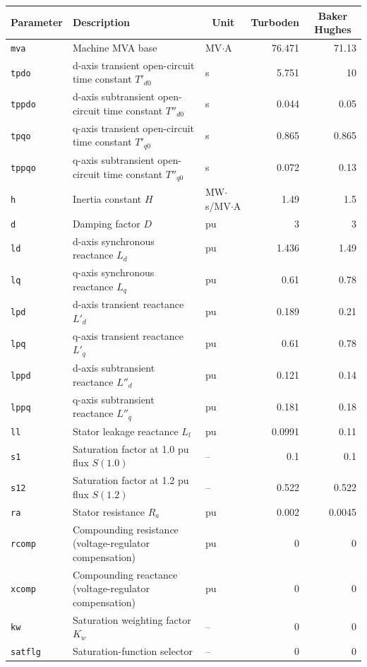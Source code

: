 \begin{tabularx}{\linewidth}{@{}l X l r r@{}}
\toprule
\textbf{Parameter} & \textbf{Description} & \multicolumn{1}{c}{\textbf{Unit}} & \multicolumn{1}{c}{\textbf{Turboden}} & \multicolumn{1}{c}{\textbf{Baker Hughes}} \\
\midrule
\texttt{mva} & Machine MVA base & MV$\cdot$A & 76.471 & 71.13 \\
\texttt{tpdo} & d-axis transient open-circuit time constant $T'_{d0}$ & s & 5.751 & 10 \\
\texttt{tppdo} & d-axis subtransient open-circuit time constant $T''_{d0}$ & s & 0.044 & 0.05 \\
\texttt{tpqo} & q-axis transient open-circuit time constant $T'_{q0}$ & s & 0.865 & 0.865 \\
\texttt{tppqo} & q-axis subtransient open-circuit time constant $T''_{q0}$ & s & 0.072 & 0.13 \\
\texttt{h} & Inertia constant $H$ & MW$\cdot$s/MV$\cdot$A & 1.49 & 1.5 \\
\texttt{d} & Damping factor $D$ & pu & 3 & 3 \\
\texttt{ld} & d-axis synchronous reactance $L_d$ & pu & 1.436 & 1.49 \\
\texttt{lq} & q-axis synchronous reactance $L_q$ & pu & 0.61 & 0.78 \\
\texttt{lpd} & d-axis transient reactance $L'_d$ & pu & 0.189 & 0.21 \\
\texttt{lpq} & q-axis transient reactance $L'_q$ & pu & 0.61 & 0.78 \\
\texttt{lppd} & d-axis subtransient reactance $L''_d$ & pu & 0.121 & 0.14 \\
\texttt{lppq} & q-axis subtransient reactance $L''_q$ & pu & 0.181 & 0.18 \\
\texttt{ll} & Stator leakage reactance $L_l$ & pu & 0.0991 & 0.11 \\
\texttt{s1} & Saturation factor at 1.0 pu flux $S(1.0)$ & -- & 0.1 & 0.1 \\
\texttt{s12} & Saturation factor at 1.2 pu flux $S(1.2)$ & -- & 0.522 & 0.522 \\
\texttt{ra} & Stator resistance $R_a$ & pu & 0.002 & 0.0045 \\
\texttt{rcomp} & Compounding resistance (voltage-regulator compensation) & pu & 0 & 0 \\
\texttt{xcomp} & Compounding reactance (voltage-regulator compensation) & pu & 0 & 0 \\
\texttt{kw} & Saturation weighting factor $K_w$ & -- & 0 & 0 \\
\texttt{satflg} & Saturation-function selector & -- & 0 & 0 \\
\bottomrule
\end{tabularx}
